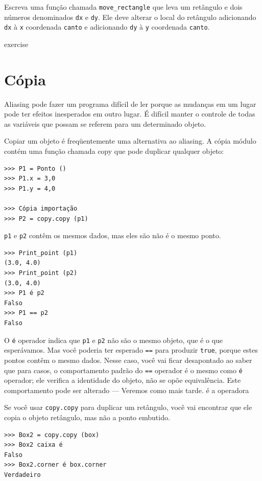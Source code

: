\documentclass[10pt]{book}
\begin{document}
\begin{exercise}
\begin{v erbatim}
{\begin{}
Escreva uma função chamada \verb "move_rectangle" que leva
um retângulo e dois números denominados {\tt dx} e {\tt dy}. Ele
deve alterar o local do retângulo adicionando {\tt dx}
à {\tt x} coordenada {\tt canto} e adicionando {\tt dy}
à {\tt y} coordenada {\tt canto}.

\end{} exercise


\section{Cópia}
\label{cópia}

Aliasing pode fazer um programa difícil de ler porque as mudanças
em um lugar pode ter efeitos inesperados em outro lugar.
É difícil manter o controle de todas as variáveis ​​que possam se referem
para um determinado objeto.

Copiar um objeto é freqüentemente uma alternativa ao aliasing.
A cópia {\tt} módulo contém uma função chamada {copy \tt} que
pode duplicar qualquer objeto:

\begin{verbatim}
>>> P1 = Ponto ()
>>> P1.x = 3,0
>>> P1.y = 4,0

>>> Cópia importação
>>> P2 = copy.copy (p1)
\end{verbatim}
%
{\tt p1} e {\tt p2} contêm os mesmos dados, mas eles são
não é o mesmo ponto.

\begin{verbatim}
>>> Print_point (p1)
(3.0, 4.0)
>>> Print_point (p2)
(3.0, 4.0)
>>> P1 é p2
Falso
>>> P1 == p2
Falso
\end{verbatim}
%
O {\tt é} operador indica que {\tt p1} e {\tt p2} não são o
mesmo objeto, que é o que esperávamos. Mas você poderia ter esperado
{\tt ==} para produzir {\tt true}, porque estes pontos contêm o mesmo
dados. Nesse caso, você vai ficar desapontado ao saber que para
casos, o comportamento padrão do {\tt ==} operador é o mesmo
como {\tt é} operador; ele verifica a identidade do objeto, não se opõe
equivalência. Este comportamento pode ser alterado --- Veremos como mais tarde.
\index{} é a operadora

Se você usar {\tt copy.copy} para duplicar um retângulo, você vai encontrar
que ele copia o objeto retângulo, mas não a ponto embutido.

\begin{verbatim}
>>> Box2 = copy.copy (box)
>>> Box2 caixa é
Falso
>>> Box2.corner é box.corner
Verdadeiro
\end{verbatim}

}
\end{v erbatim}
\end{exercise}
\end{document}
